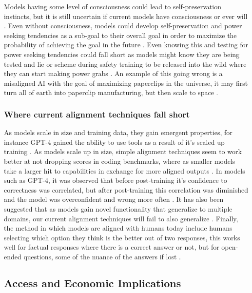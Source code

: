 Models having some level of consciousness could lead to self-preservation instincts, but it is still uncertain if current models have consciousness or ever will \citep{ward_towards_2025, butlin_consciousness_2023}. Even without consciousness, models could develop self-preservation and power seeking tendencies as a sub-goal to their overall goal in order to maximize the probability of achieving the goal in the future \citep{bostrom_superintelligent_2012}. Even knowing this and testing for power seeking tendencies could fall short as models might know they are being tested and lie or scheme during safety training to be released into the wild where they can start making power grabs \citep{carlsmith_scheming_2023}. An example of this going wrong is a misaligned AI with the goal of maximizing paperclips in the universe, it may first turn all of earth into paperclip manufacturing, but then scale to space \citep{bostrom_ethical_2003}.

\subsubsection{Where current alignment techniques fall short}

As models scale in size and training data, they gain emergent properties, for instance GPT-4 gained the ability to use tools as a result of it's scaled up training \citep{bubeck_sparks_2023}. As models scale up in size, simple alignment techniques seem to work better at not dropping scores in coding benchmarks, where as smaller models take a larger hit to capabilities in exchange for more aligned outputs \citep{askell_general_2021}. In models such as GPT-4, it was observed that before post-training it's confidence to correctness was correlated, but after post-training this correlation was diminished and the model was overconfident and wrong more often \citep{openai_gpt_4_2023}. It has also been suggested that as models gain novel functionality that generalize to multiple domains, our current alignment techniques will fail to also generalize \citep{soares_central_2022}. Finally, the method in which models are aligned with humans today include humans selecting which option they think is the better out of two responses, this works well for factual responses where there is a correct answer or not, but for open-ended questions, some of the nuance of the answers if lost \citep{song_reward_2023}.

\subsection{Access and Economic Implications}

